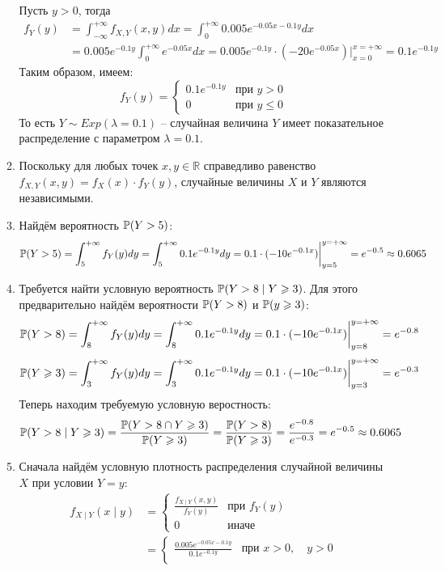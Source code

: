 \begin{enumerate}
\begin{enumerate}
Пусть $y > 0 $, тогда
\begin{align*}
f_Y (y) &= \int_{-\infty}^{+\infty} f_{X, Y} (x, y) dx  = \int_{0}^{+\infty} 0.005 e^{-0.05x-0.1y} dx \\
&= 0.005e^{-0.1y} \int_{0}^{+\infty} e^{-0.05x} dx = 0.005e^{-0.1y} \cdot \left(-20e^{-0.05x} \right) \bigg\vert_{x=0}^{x=+\infty} = 0.1 e^{-0.1y}
\end{align*}
Таким образом, имеем:
\[
f_Y (y) = \begin{cases}
0.1 e^{-0.1y} & \text{при } y>0 \\
0 & \text{при } y \leq 0
\end{cases}
\]
То есть $Y \sim Exp(\lambda=0.1)$ – случайная величина $Y$ имеет показательное распределение с параметром $\lambda = 0.1$.
\item Поскольку для любых точек $x, y \in \mathbb{R}$ справедливо равенство $f_{X, Y} (x, y) = f_X (x) \cdot f_Y (y)$, случайные величины $X$ и $Y$ являются независимыми.
\item Найдём вероятность $\P(Y>5)$:
\[
\P(Y>5) = \int_{5}^{+\infty} f_Y (y) dy = \int_{5}^{+\infty}  0.1 e^{-0.1y} dy = 0.1 \cdot (-10 e^{-0.1x}) \bigg\vert_{y=5}^{y=+\infty} = e^{-0.5} \approx0.6065
\]
\item Требуется найти условную вероятность $\P(Y>8 \mid Y \geq 3)$. Для этого предварительно найдём вероятности $\P(Y>8)$ и $\P(y \geq 3)$:
\[
\P(Y>8) = \int_{8}^{+\infty} f_Y (y) dy  = \int_{8}^{+\infty}  0.1 e^{-0.1y} dy = 0.1 \cdot (-10 e^{-0.1x}) \bigg\vert_{y=8}^{y=+\infty} = e^{-0.8}
\]
\[
\P(Y \geq 3) =  \int_{3}^{+\infty} f_Y (y) dy   =  \int_{3}^{+\infty}  0.1 e^{-0.1y} dy = 0.1 \cdot (-10 e^{-0.1x}) \bigg\vert_{y=3}^{y=+\infty} = e^{-0.3}
\]
Теперь находим требуемую условную веростность:
\[
\P(Y>8 \mid Y \geq 3) = \frac{\P(Y > 8 \cap
Y \geq 3)}{\P(Y \geq 3)} = \frac{\P(Y>8)}{\P(Y \geq 3) } = \frac{e^{-0.8}}{e^{-0.3}} = e^{-0.5} \approx0.6065
\]
\item Сначала найдём условную плотность распределения случайной величины $X$ при условии $Y=y$:
\begin{align*}
f_{X \mid Y} (x \mid y) &=
\begin{cases}
\frac{f_{X \mid Y} (x, y)}{f_Y (y)} & \text{при } f_Y (y) \\
0 & \text{иначе}
\end{cases} \\
&=
\begin{cases}
\frac{0.005e^{-0.05x-0.1y}}{0.1e^{-0.1y}} & \text{при } x>0, \quad y>0 \\

\end{cases}
\end{align*}
\end{enumerate}
\end{enumerate}
